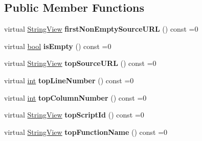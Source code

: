 \subsection*{Public Member Functions}
\begin{DoxyCompactItemize}
\item 
\mbox{\label{classv8__inspector_1_1V8StackTrace_a32e15ef6ab406cce52702b8b7351d9d5}} 
virtual \mbox{\hyperlink{classv8__inspector_1_1StringView}{String\+View}} {\bfseries first\+Non\+Empty\+Source\+U\+RL} () const =0
\item 
\mbox{\label{classv8__inspector_1_1V8StackTrace_a969853e542a4df1eafd84da4cdd53728}} 
virtual \mbox{\hyperlink{classbool}{bool}} {\bfseries is\+Empty} () const =0
\item 
\mbox{\label{classv8__inspector_1_1V8StackTrace_a66a69050f9e87393455fbbf989f1d01d}} 
virtual \mbox{\hyperlink{classv8__inspector_1_1StringView}{String\+View}} {\bfseries top\+Source\+U\+RL} () const =0
\item 
\mbox{\label{classv8__inspector_1_1V8StackTrace_a12a71905644e1faf9c820abafa9d94f9}} 
virtual \mbox{\hyperlink{classint}{int}} {\bfseries top\+Line\+Number} () const =0
\item 
\mbox{\label{classv8__inspector_1_1V8StackTrace_a7c6a4edfd7769e73e2f0562659a57a53}} 
virtual \mbox{\hyperlink{classint}{int}} {\bfseries top\+Column\+Number} () const =0
\item 
\mbox{\label{classv8__inspector_1_1V8StackTrace_a82e378f1190c0215d21656980c427b13}} 
virtual \mbox{\hyperlink{classv8__inspector_1_1StringView}{String\+View}} {\bfseries top\+Script\+Id} () const =0
\item 
\mbox{\label{classv8__inspector_1_1V8StackTrace_a0d7ede4b2a6ba52372a42295924fd7f1}} 
virtual \mbox{\hyperlink{classv8__inspector_1_1StringView}{String\+View}} {\bfseries top\+Function\+Name} () const =0
\item 
\mbox{\label{classv8__inspector_1_1V8StackTrace_a6dbec10e0db0c650f43465f75c35c8e3}} 

\end{DoxyCompactItemize}
